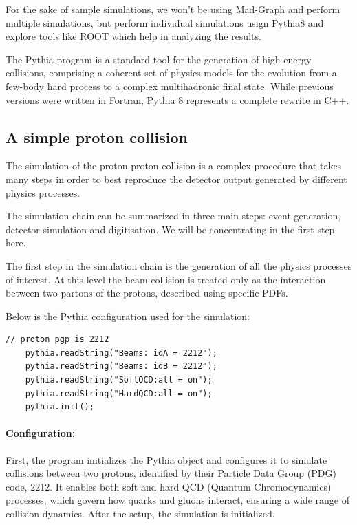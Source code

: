 \documentclass[letterpaper,12pt]{article}
\begin{document}
\begin{spacing}{1.125}
For the sake of sample simulations, we won't be using Mad-Graph and perform
multiple simulations, but perform individual simulations usign Pythia8 and
explore tools like ROOT which help in analyzing the results.

The Pythia program is a standard tool for the generation of high-energy
collisions, comprising a coherent set of physics models for the evolution from a
few-body hard process to a complex multihadronic final state. While previous
versions were written in Fortran, Pythia 8 represents a complete rewrite in
C++.

\subsection{A simple proton collision}

The simulation of the proton-proton collision is a complex procedure that takes
many steps in order to
best reproduce the detector output generated by different physics processes.

The simulation chain can be summarized in three main steps: event generation,
detector simulation
and digitisation. We will be concentrating in the first step here.

The first step in the simulation chain is the generation of all the physics
processes of interest. At this level
the beam collision is treated only as the interaction between two partons of the
protons, described using
specific PDFs.

Below is the Pythia configuration used for the simulation:
\begin{lstlisting}[style=python, caption={Pythia configuration for Sample Simulation}]
    // proton pgp is 2212
    pythia.readString("Beams: idA = 2212");
    pythia.readString("Beams: idB = 2212");
    pythia.readString("SoftQCD:all = on");
    pythia.readString("HardQCD:all = on");
    pythia.init();
\end{lstlisting}

\paragraph{Configuration:}
First, the program initializes the Pythia object and configures it to simulate
collisions between two protons, identified by their Particle Data Group (PDG)
code, 2212. It enables both soft and hard QCD (Quantum Chromodynamics)
processes, which govern how quarks and gluons interact, ensuring a wide range of
collision dynamics. After the setup, the simulation is initialized.


\end{spacing}
\end{document}
